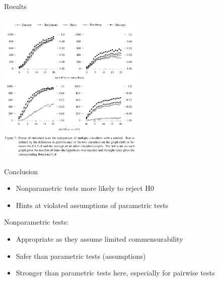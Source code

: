 \documentclass[aspectratio=169,12pt]{beamer}
\providecommand{\tightlist}{%
  \setlength{\itemsep}{2pt}\setlength{\parskip}{0pt}}
\begin{document}
\begin{frame}{Results}
\label{results-2}
\begin{center}
\includegraphics[width=2.76in,height=0.9\textheight]{img/fig7.png}
\end{center}
\end{frame}

\begin{frame}{Conclusion}
\label{conclusion}
\begin{itemize}
\tightlist
\item
  Nonparametric tests more likely to reject H0
\item
  Hints at violated assumptions of parametric tests
\end{itemize}

\vfill{} \pause

Nonparametric tests:

\begin{itemize}
\tightlist
\item
  Appropriate as they assume limited commensurability
\item
  Safer than parametric tests (assumptions)
\item
  Stronger than parametric tests here, especially for pairwise tests
\end{itemize}
\end{frame}


\end{document}
